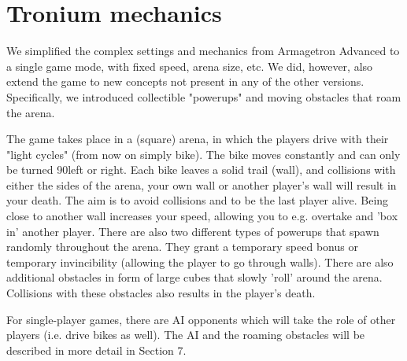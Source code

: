 \documentclass{report}
\begin{document}
 \section{Tronium mechanics }
We simplified the complex settings and mechanics from Armagetron Advanced to a single game mode, with fixed speed, arena size, etc.
We did, however, also extend the game to new concepts not present in any of the other versions. Specifically, we introduced collectible "powerups" and moving obstacles that roam the arena.

The game takes place in a (square) arena, in which the players drive with their "light cycles" (from now on simply bike).
The bike moves constantly and can only be turned 90\textdegree left or right.
Each bike leaves a solid trail (wall), and collisions with either the sides of the arena, your own wall or another player's wall will result in your death.
The aim is to avoid collisions and to be the last player alive.
Being close to another wall increases your speed, allowing you to e.g. overtake and 'box in' another player.
There are also two different types of powerups that spawn randomly throughout the arena. 
They grant a temporary speed bonus or temporary invincibility (allowing the player to go through walls).
There are also additional obstacles in form of large cubes that slowly 'roll' around the arena. Collisions with these obstacles also results in the player's death. 

For single-player games, there are AI opponents which will take the role of other players (i.e. drive bikes as well).
The AI and the roaming obstacles will be described in more detail in Section 7.
\end{document}
